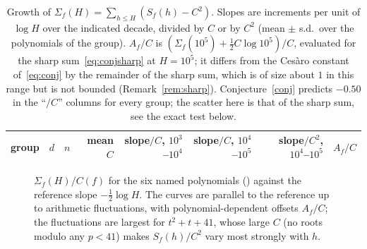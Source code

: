 \documentclass[11pt,a4paper]{article}
\theoremstyle{remark}\newtheorem{remark}[theorem]{Remark}
\begin{document}
\begin{table}[htbp]
\centering\footnotesize\setlength{\tabcolsep}{3pt}
\caption{Growth of $\Sigma_f(H)=\sum_{h\le H}(S_f(h)-C^2)$. Slopes are increments per unit of
$\log H$ over the indicated decade, divided by $C$ or by $C^2$ (mean $\pm$ s.d.\ over the polynomials of
the group). $A_f/C$ is $(\Sigma_f(10^5)+\tfrac12C\log10^5)/C$, evaluated for the sharp sum~\eqref{eq:conjsharp}
at $H=10^5$; it differs from the Ces\`aro constant of~\eqref{eq:conj} by the remainder of the sharp sum, which is of
size about $1$ in this range but is not bounded (Remark~\ref{rem:sharp}). Conjecture~\ref{conj} predicts $-0.50$ in the ``$/C$'' columns for every group; the scatter here is that
of the sharp sum, see the exact test below.}\label{tab:sums}
\begin{tabular}{lrrrrrrr}
\toprule
group & $d$ & $n$ & mean $C$ & slope$/C$, $10^3$--$10^4$ & slope$/C$, $10^4$--$10^5$ & slope$/C^2$, $10^4$--$10^5$ & $A_f/C$\\
\midrule

\end{tabular}
\end{table}

\begin{figure}[t]
\centering
{}
\caption{$\Sigma_f(H)/C(f)$ for the six named polynomials (\sumsNamedLegend) against the reference
slope $-\tfrac12\log H$. The curves are parallel to the reference up to arithmetic fluctuations, with
polynomial-dependent offsets $A_f/C$; the fluctuations are largest for $t^2+t+41$, whose large
$C$ (no roots modulo any $p<41$) makes $S_f(h)/C^2$ vary most strongly with $h$.}\label{fig:curves}
\end{figure}
\end{document}
